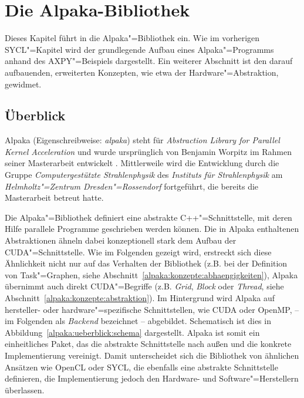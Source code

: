 \chapter{Die Alpaka-Bibliothek}\label{alpaka}

Dieses Kapitel führt in die Alpaka"=Bibliothek ein. Wie im vorherigen
SYCL"=Kapitel wird der grundlegende Aufbau eines Alpaka"=Programms anhand des
AXPY"=Beispiels dargestellt. Ein weiterer Abschnitt ist den darauf aufbauenden,
erweiterten Konzepten, wie etwa der Hardware"=Abstraktion, gewidmet.

\section{Überblick}\label{alpaka:ueberblick}

Alpaka (Eigenschreibweise: \textit{alpaka}) steht für
\textit{Abstraction Library for Parallel Kernel Acceleration} und wurde
ursprünglich von Benjamin Worpitz im Rahmen seiner Masterarbeit entwickelt
\cite[vgl.][]{worpitz2015}. Mittlerweile wird die Entwicklung durch
die Gruppe \textit{Computergestützte Strahlenphysik} des
\textit{Instituts für Strahlenphysik} am
\textit{Helmholtz"=Zentrum Dresden"=Rossendorf} fortgeführt, die bereits die
Masterarbeit betreut hatte.

Die Alpaka"=Bibliothek definiert eine abstrakte C++"=Schnittstelle, mit deren
Hilfe parallele Programme geschrieben werden können. Die in Alpaka enthaltenen
Abstraktionen ähneln dabei konzeptionell stark dem Aufbau der
CUDA"=Schnittstelle. Wie im Folgenden gezeigt wird, erstreckt sich diese
Ähnlichkeit nicht nur auf das Verhalten der Bibliothek (z.B. bei der Definition
von Task"=Graphen, siehe Abschnitt~\ref{alpaka:konzepte:abhaengigkeiten}),
Alpaka übernimmt auch direkt CUDA"=Begriffe (z.B. \textit{Grid}, \textit{Block}
oder \textit{Thread}, siehe  Abschnitt~\ref{alpaka:konzepte:abstraktion}). Im
Hintergrund wird Alpaka auf hersteller- oder hardware"=spezifische
Schnittstellen, wie CUDA oder OpenMP, -- im Folgenden als \textit{Backend}
bezeichnet -- abgebildet. Schematisch ist dies in
Abbildung~\ref{alpaka:ueberblick:schema} dargestellt. Alpaka ist somit ein
einheitliches Paket, das die abstrakte Schnittstelle nach außen und die konkrete
Implementierung vereinigt. Damit unterscheidet sich die Bibliothek von ähnlichen
Ansätzen wie OpenCL oder SYCL, die ebenfalls eine abstrakte Schnittstelle
definieren, die Implementierung jedoch den Hardware- und Software"=Herstellern
überlassen.

